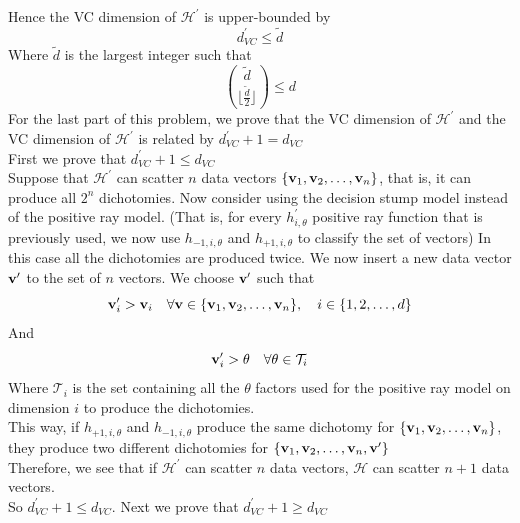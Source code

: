 \documentclass[11pt]{article}
\theoremstyle{definition}
\begin{document}
 Hence the VC dimension of $\mathcal{H}^\prime$ is upper-bounded by
 \[
   d^\prime_{VC} \leq \tilde{d}
 \]
 Where $\tilde{d}$ is the largest integer such that
 \[
   {\tilde{d}\choose \lfloor\frac{\tilde{d}}{2}\rfloor} \leq d
 \]
 \medbreak
 For the last part of this problem, we prove that the VC dimension of $\mathcal{H}^\prime$ and the VC dimension of $\mathcal{H}^\prime$ is related by $d_{VC}^\prime + 1= d_{VC}$ \\ 
 \medbreak
 First we prove that $d^\prime_{VC} + 1 \leq d_{VC}$ \\ 
 Suppose that $\mathcal{H}^\prime$ can scatter $n$ data vectors $\{\vb{v}_1, \vb{v}_2,\dots,\vb{v}_n\}$, that is, it can produce all $2^n$ dichotomies. Now consider using the decision stump model instead of the positive ray model. (That is, for every $h^\prime_{i, \theta}$ positive ray function that is previously used, we now use $h_{-1, i, \theta}$ and $h_{+1, i, \theta}$ to classify the set of vectors) In this case all the dichotomies are produced twice. We now insert a new data vector $\vb{v}^\prime$ to the set of $n$ vectors. We choose $\vb{v}^\prime$ such that
 \[
   \vb{v}^\prime_i > \vb{v}_i\quad \forall \vb{v}\in \{\vb{v}_1, \vb{v}_2,\dots,\vb{v}_n\}, \quad i \in \{1, 2,\dots,d\}
 \]
 And
 \[
   \vb{v}^\prime_i > \theta \quad \forall \theta \in \mathcal{T}_i
 \]
 Where $\mathcal{T}_i$ is the set containing all the $\theta$ factors used for the positive ray model on dimension $i$ to produce the dichotomies. \\ 
 This way, if $h_{+1, i, \theta}$ and $h_{-1, i, \theta}$ produce the same dichotomy for $\{\vb{v}_1, \vb{v}_2,\dots,\vb{v}_n\}$, they produce two different dichotomies for $\{\vb{v}_1, \vb{v}_2,\dots,\vb{v}_n, \vb{v}^\prime\}$ \\ 
 Therefore, we see that if $\mathcal{H}^\prime$ can scatter $n$ data vectors, $\mathcal{H}$ can scatter $n + 1$ data vectors. \\ 
 So $d^\prime_{VC} + 1 \leq d_{VC}$.
 \medbreak
 Next we prove that $d^\prime_{VC} + 1 \geq d_{VC}$ \\ 
\end{document}
